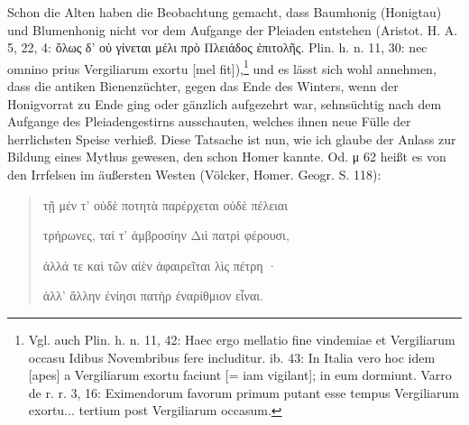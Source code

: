 \documentclass[a4paper, 11pt, oneside]{article}
\begin{document}
Schon die Alten haben die Beobachtung gemacht, dass Baumhonig (Honigtau) und Blumenhonig nicht vor dem Aufgange der Pleiaden entstehen (Aristot. H. A. 5, 22, 4: ὅλως δ' οὐ γίνεται μέλι πρὸ Πλειάδος ἐπιτολῆς. Plin. h. n. 11, 30: nec omnino prius Vergiliarum exortu [mel fit]),\footnote{Vgl. auch Plin. h. n. 11, 42: Haec ergo mellatio fine vindemiae et Vergiliarum occasu Idibus Novembribus fere includitur. ib. 43: In Italia vero hoc idem [apes] a Vergiliarum exortu faciunt [= iam vigilant]; in eum dormiunt. Varro de r. r. 3, 16: Eximendorum favorum primum putant esse tempus Vergiliarum exortu... tertium post Vergiliarum occasum.} und es lässt sich wohl annehmen, dass die antiken Bienenzüchter, gegen das Ende des Winters, wenn der Honigvorrat zu Ende ging oder gänzlich aufgezehrt war, sehnsüchtig nach dem Aufgange des Pleiadengestirns ausschauten, welches ihnen neue Fülle der herrlichsten Speise verhieß. Diese Tatsache ist nun, wie ich glaube der Anlass zur Bildung eines Mythus gewesen, den schon Homer kannte. Od. μ 62 heißt es von den Irrfelsen im äußersten Westen (Völcker, Homer. Geogr. S. 118):
\begin{quotation}
τῇ μέν τ' οὐδὲ ποτητὰ παρέρχεται οὐδὲ πέλειαι

τρήρωνες, ταί τ' ἀμβροσίην Διὶ πατρὶ φέρουσι,

ἀλλά τε καὶ τῶν αἰὲν ἀφαιρεῖται λὶς πέτρη ·

ἀλλ' ἄλλην ἐνίησι πατὴρ ἐναρίθμιον εἶναι.
\end{quotation}
\end{document}
